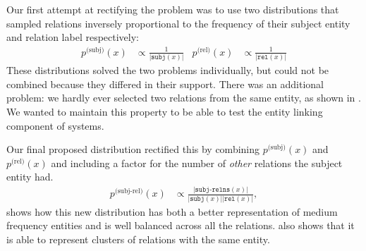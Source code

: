 Our first attempt at rectifying the problem was to use two distributions that sampled relations inversely proportional to the frequency of their subject entity and relation label respectively:
 \begin{align*}
   p^{\text{(subj)}}(x) &\propto \frac{1}{|\texttt{subj}(x)|} &
   p^{\text{(rel)}}(x) &\propto \frac{1}{|\texttt{rel}(x)|}
 \end{align*}
 These distributions solved the two problems individually, but could not be combined because they differed in their support.
 There was an additional problem: we hardly ever selected two relations from the same entity, as shown in .
 We wanted to maintain this property to be able to test the entity linking component of systems.
 
 Our final proposed distribution rectified this by combining $p^{\text{(subj)}}(x)$ and $p^{\text{(rel)}}(x)$ and including a factor for the number of \textit{other} relations the subject entity had.
 \begin{align*}
   p^{\text{(subj-rel)}}(x) &\propto \frac{|\texttt{subj-relns}(x)|}{|\texttt{subj}(x)| |\texttt{rel}(x)|},
 \end{align*}
  shows how this new distribution has both a better representation of medium frequency entities and is well balanced across all the relations.
  also shows that it is able to represent clusters of relations with the same entity.

